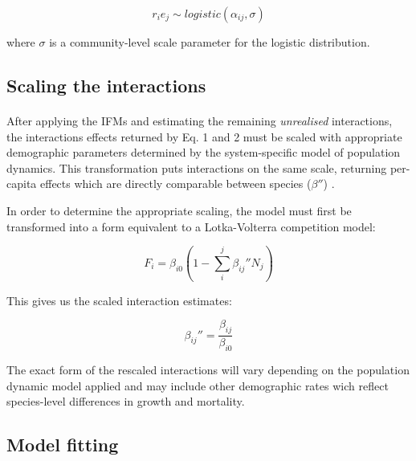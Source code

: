 \documentclass[a4,12pt]{article}
\begin{document}
        \begin{equation}
        r_i e_j \sim logistic \left ( \alpha_{ij}, \sigma \right )
        \label{unrealised}
        \end{equation}
    
        where $\sigma$ is a community-level scale parameter for the logistic distribution. 
        
    \subsection{Scaling the interactions}
        
        \paragraph{}
        After applying the IFMs and estimating the remaining \textit{unrealised} interactions, the interactions effects returned by Eq. 1 and 2 must be scaled with appropriate demographic parameters determined by the system-specific model of population dynamics. This transformation puts interactions on the same scale, returning per-capita effects which are directly comparable between species (${\beta}''$) \citep{Godoy2014, Bimler2018a}. 
        
        In order to determine the appropriate scaling, the model must first be transformed into a form equivalent to a Lotka-Volterra competition model: 

        \begin{equation}
        F_{i} = \beta_{i0} \left ( 1 - \sum_{i}^{j} {\beta_{ij}}'' N_{j} \right )
        \label{LVform}
        \end{equation}

        This gives us the scaled interaction estimates: 
 
        \begin{equation}
        {\beta_{ij}}'' = \frac{\beta_{ij}}{\beta_{i0}}
        \label{scaling}
        \end{equation}

        The exact form of the rescaled interactions will vary depending on the population dynamic model applied and may include other demographic rates wich reflect species-level differences in growth and mortality.
        
    \subsection{Model fitting}
\end{document}
